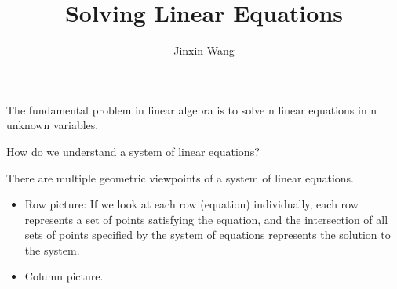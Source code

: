 \documentclass{article}
\title{Solving Linear Equations}
\author{Jinxin Wang}
\date{}
\begin{document}
    
\maketitle

The fundamental problem in linear algebra is to solve n linear equations in n 
unknown variables.

How do we understand a system of linear equations?

There are multiple geometric viewpoints of a system of linear equations.
\begin{itemize}
  \item Row picture: If we look at each row (equation) individually, each row 
  represents a set of points satisfying the equation, and the intersection of 
  all sets of points specified by the system of equations represents the 
  solution to the system.
  \item Column picture.
\end{itemize}
\end{document}
